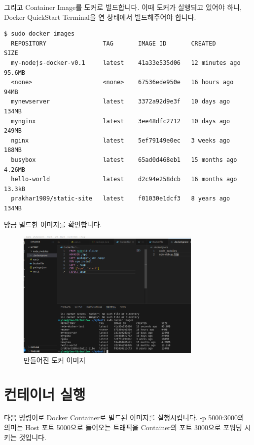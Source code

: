\documentclass{article}
\begin{document}
그리고 Container Image를 도커로 빌드합니다. 이때 도커가 실행되고 있어야 하니, Docker QuickStart Terminal을 연 상태에서 빌드해주어야 합니다.

\begin{lstlisting}[language=Shell, caption={도커 이미지 조회}]
  $ sudo docker images
  REPOSITORY                TAG       IMAGE ID       CREATED          SIZE
  my-nodejs-docker-v0.1     latest    41a33e535d06   12 minutes ago   95.6MB
  <none>                    <none>    67536ede950e   16 hours ago     94MB
  mynewserver               latest    3372a92d9e3f   10 days ago      134MB
  mynginx                   latest    3ee48dfc2712   10 days ago      249MB
  nginx                     latest    5ef79149e0ec   3 weeks ago      188MB
  busybox                   latest    65ad0d468eb1   15 months ago    4.26MB
  hello-world               latest    d2c94e258dcb   16 months ago    13.3kB
  prakhar1989/static-site   latest    f01030e1dcf3   8 years ago      134MB
\end{lstlisting}

방금 빌드한 이미지를 확인합니다.

\begin{figure}[hbt]
  \centering
  \includegraphics[width=0.8\textwidth]{images/dockerimage.png}
  \caption{만들어진 도커 이미지 }
  \label{fig:dockerimage}
\end{figure}

\section{컨테이너 실행}

다음 명령어로 Docker Container로 빌드된 이미지를 실행시킵니다. -p 5000:3000의 의미는 Host 포트 5000으로 들어오는 트래픽을 Container의 포트 3000으로 포워딩 시키는 것입니다. 
\end{document}

